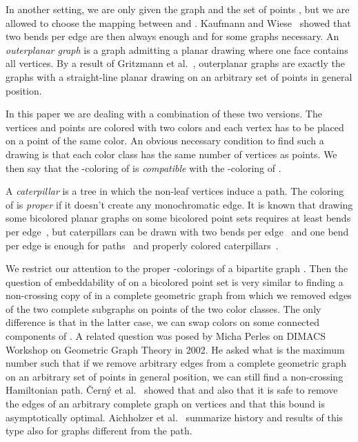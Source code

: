 \documentclass[12pt]{article}
\begin{document}
In another setting, we are only given the graph  and the set of points , but we
are allowed to choose the mapping between  and .
Kaufmann and Wiese~\cite{kaufmannwiese} showed that two bends per edge are then always enough 
and for some graphs necessary. An \emph{outerplanar graph} is a graph admitting a planar drawing 
where one face contains all vertices. By a result of Gritzmann et al.~\cite{gritzmann91}, 
outerplanar graphs are exactly the graphs with a straight-line planar drawing on 
an arbitrary set of points in general position.

In this paper we are dealing with a combination of these two versions. The vertices and
points are colored with two colors and each vertex has to be placed on a point of the 
same color. An obvious necessary condition to find such a drawing is that each color class
has the same number of vertices as points. 
We then say that the -coloring of  is \emph{compatible} with the -coloring of .

A \emph{caterpillar} is a tree in which the non-leaf vertices induce a path. 
The coloring of  is \emph{proper} if it doesn't create any monochromatic edge.
It is known that drawing some bicolored planar graphs on some bicolored point sets requires 
at least  bends per edge~\cite{giacomograph},
but caterpillars can be drawn with two bends per edge~\cite{giacomograph} and one bend per
edge is enough for paths~\cite{giacomopath} and properly colored caterpillars~\cite{giacomograph}.

We restrict our attention to the proper -colorings of a bipartite graph . Then 
the question of embeddability of  on a bicolored point set is very similar to finding a non-crossing
copy of  in a complete geometric graph from which we removed edges of the two complete subgraphs
on points of the two color classes. 
The only difference is that in the latter case, we can swap colors on some connected components of .
A related question was posed by Micha Perles on DIMACS Workshop on Geometric Graph Theory in 2002.
He asked what is the maximum number  such that if we remove arbitrary  edges  
from a complete geometric graph on an arbitrary set of  points in general position, we
can still find a non-crossing Hamiltonian path.
\v{C}ern\'y et al.~\cite{cerny07} showed that 
and also that it is safe to remove the edges of an arbitrary complete graph
on  vertices and that this bound is asymptotically optimal. 
Aichholzer et al.~\cite{aichholzer10} summarize history and results of this type also for
graphs different from the path.
\end{document}
